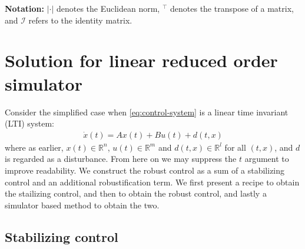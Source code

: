 \documentclass[10pt,a4paper]{amsart}
\newcommand{\tp}{^\top}
\newcommand{\R}{\mathbb{R}}
\newcommand{\normal}{\mathcal{N}}
\newcommand{\one}{\mathds{1}}
\newcommand{\id}{\mathcal{I}}
\begin{document}



\textbf{Notation:} %
$|\cdot|$ denotes the Euclidean norm, $\tp$ denotes the transpose of a matrix, and $\id$ refers to the identity matrix.

\section{Solution for linear reduced order simulator}
\label{sec:linear}

Consider the simplified case when \eqref{eq:control-system} is a linear time invariant (LTI) system:
\begin{align}
\dot{x}(t) = Ax(t) + Bu(t) + d(t,x)
\label{eq:lin-control-system}
\end{align}
where as earlier, $x(t) \in \R^n$, $u(t) \in \R^m$ and 
$d(t,x) \in \R^l$ for all $(t,x)$, and $d$ is regarded as a disturbance. From here on we may suppress the $t$ argument to improve readability. We construct the robust control as a sum of a stabilizing control and an additional robustification term. We first present a recipe to obtain the stailizing control, and then to obtain the robust control, and lastly a simulator based method to obtain the two. 

\subsection{Stabilizing control}
\end{document}

